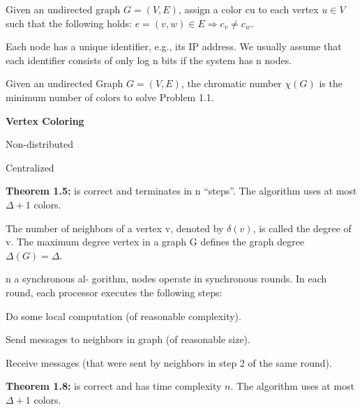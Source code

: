 

{
	Given an undirected graph $G = (V, E)$, assign a color cu to each vertex $u \in
	V$ such that the following holds: $e = (v,w) \in E \Rightarrow c_v \neq c_w$.
} 

{
	Each node has a unique identifier, e.g., its IP address. We usually assume that
	each identifier consists of only log n bits if the system has n nodes.
}

{
	Given an undirected Graph $G = (V, E)$, the chromatic number $\chi (G)$ is the
	minimum number of colors to solve Problem 1.1. 
}

{
\begin{items}
	\item {\bf Vertex Coloring}
  \item Non-distributed
  \item Centralized
  \item {\bf Theorem 1.5:} is correct and terminates in n ``steps''. The
  algorithm uses at most $\Delta+1$ colors.
\end{items}
}

{
	The number of neighbors of a vertex v, denoted by $\delta (v)$, is called the
	degree of v. The maximum degree vertex in a graph G defines the graph degree
	$\Delta (G) = \Delta$.
}

{
	n a synchronous al- gorithm, nodes operate in synchronous rounds. In each
	round, each processor executes the following steps:
	\begin{enum}
	  \item Do some local computation (of reasonable complexity).
		\item Send messages to neighbors in graph (of reasonable size).
		\item Receive messages (that were sent by neighbors in step 2 of the same
		round).
	\end{enum} 
}

{
	\begin{items}
		\item {\bf Theorem 1.8:} is correct and has time complexity $n$. The algorithm uses
		at most $\Delta+1$ colors.
	\end{items}
}

